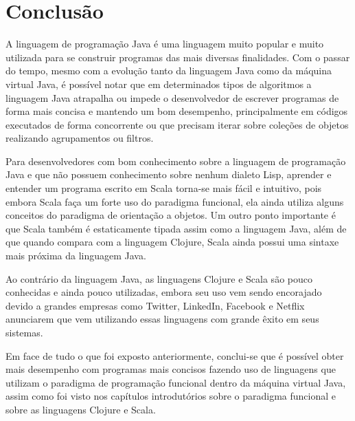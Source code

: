 \chapter{Conclusão}

\vspace{-1.9cm}

  A linguagem de programação Java é uma linguagem muito popular e muito utilizada para se construir programas das mais diversas finalidades. Com o passar do tempo, mesmo com a evolução tanto da linguagem Java como da máquina virtual Java, é possível notar que em determinados tipos de algoritmos a linguagem Java atrapalha ou impede o desenvolvedor de escrever programas de forma mais concisa e mantendo um bom desempenho, principalmente em códigos executados de forma concorrente ou que precisam iterar sobre coleções de objetos realizando agrupamentos ou filtros.

  Para desenvolvedores com bom conhecimento sobre a linguagem de programação Java e que não possuem conhecimento sobre nenhum dialeto Lisp, aprender e entender um programa escrito em Scala torna-se mais fácil e intuitivo, pois embora Scala faça um forte uso do paradigma funcional, ela ainda utiliza alguns conceitos do paradigma de orientação a objetos. Um outro ponto importante é que Scala também é estaticamente tipada assim como a linguagem Java, além de que quando compara com a linguagem Clojure, Scala ainda possui uma sintaxe mais próxima da linguagem Java.

  Ao contrário da linguagem Java, as linguagens Clojure e Scala são pouco conhecidas e ainda pouco utilizadas, embora seu uso vem sendo encorajado devido a grandes empresas como Twitter, LinkedIn, Facebook e Netflix anunciarem que vem utilizando essas linguagens com grande êxito em seus sistemas.

  Em face de tudo o que foi exposto anteriormente, conclui-se que é possível obter mais desempenho com programas mais concisos fazendo uso de linguagens que utilizam o paradigma de programação funcional dentro da máquina virtual Java, assim como foi visto nos capítulos introdutórios sobre o paradigma funcional e sobre as linguagens Clojure e Scala.
